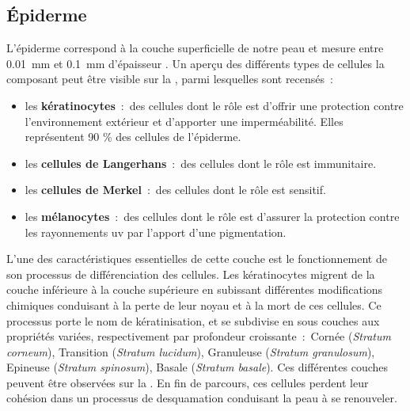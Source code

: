 \subsection{Épiderme}
L’épiderme correspond à la couche superficielle de notre peau et mesure entre \SI{0,01}{\milli\metre} et \SI{0,1}{\milli\metre} d’épaisseur \cite{Sandby-Moller2003}. Un aperçu des différents types de cellules la composant peut être visible sur la , parmi lesquelles sont recensés~:
\begin{itemize}
    \item les \textbf{kératinocytes}~:~des cellules dont le rôle est d'offrir une protection contre l'environnement extérieur et d'apporter une imperméabilité. Elles représentent 90 \% des cellules de l'épiderme.
    \item les \textbf{cellules de Langerhans}~:~des cellules dont le rôle est immunitaire.
    \item les \textbf{cellules de Merkel}~:~des cellules dont le rôle est sensitif.
    \item les \textbf{mélanocytes}~:~des cellules dont le rôle est d'assurer la protection contre les rayonnements \gls{uv} par l'apport d'une pigmentation.
\end{itemize}\par

L'une des caractéristiques essentielles de cette couche est le fonctionnement de son processus de différenciation des cellules. Les kératinocytes migrent de la couche inférieure à la couche supérieure en subissant différentes modifications chimiques conduisant à la perte de leur noyau et à la mort de ces cellules. Ce processus porte le nom de kératinisation, et se subdivise en sous couches aux propriétés variées, respectivement par profondeur croissante~:~Cornée (\textit{Stratum corneum}), Transition (\textit{Stratum lucidum}), Granuleuse (\textit{Stratum granulosum}), Epineuse (\textit{Stratum spinosum}), Basale (\textit{Stratum basale}). Ces différentes couches peuvent être observées sur la . En fin de parcours, ces cellules perdent leur cohésion dans un processus de desquamation conduisant la peau à se renouveler.\par

